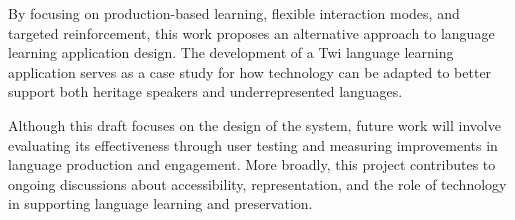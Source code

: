 \documentclass[12pt]{article}
\begin{document}
By focusing on production-based learning, flexible interaction modes, and targeted reinforcement, this work proposes an alternative approach to language learning application design. The development of a Twi language learning application serves as a case study for how technology can be adapted to better support both heritage speakers and underrepresented languages.

Although this draft focuses on the design of the system, future work will involve evaluating its effectiveness through user testing and measuring improvements in language production and engagement. More broadly, this project contributes to ongoing discussions about accessibility, representation, and the role of technology in supporting language learning and preservation.




\end{document}
